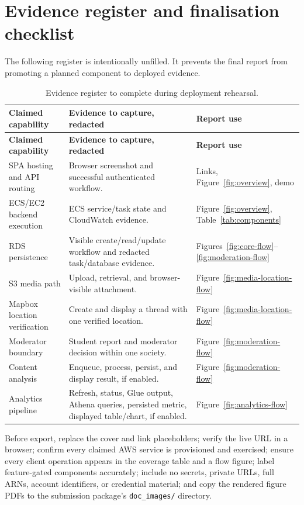 \documentclass[11pt,a4paper]{article}
\begin{document}
\section{Evidence register and finalisation checklist}
The following register is intentionally unfilled. It prevents the final report from promoting a planned component to deployed evidence.
\begin{longtable}{@{}p{38mm}p{80mm}p{35mm}@{}}
\caption{Evidence register to complete during deployment rehearsal.}\\
\toprule \textbf{Claimed capability} & \textbf{Evidence to capture, redacted} & \textbf{Report use}\\ \midrule
\endfirsthead
\toprule \textbf{Claimed capability} & \textbf{Evidence to capture, redacted} & \textbf{Report use}\\ \midrule
\endhead
SPA hosting and API routing & Browser screenshot and successful authenticated workflow. & Links, Figure~\ref{fig:overview}, demo\\
ECS/EC2 backend execution & ECS service/task state and CloudWatch evidence. & Figure~\ref{fig:overview}, Table~\ref{tab:components}\\
RDS persistence & Visible create/read/update workflow and redacted task/database evidence. & Figures~\ref{fig:core-flow}--\ref{fig:moderation-flow}\\
S3 media path & Upload, retrieval, and browser-visible attachment. & Figure~\ref{fig:media-location-flow}\\
Mapbox location verification & Create and display a thread with one verified location. & Figure~\ref{fig:media-location-flow}\\
Moderator boundary & Student report and moderator decision within one society. & Figure~\ref{fig:moderation-flow}\\
Content analysis & Enqueue, process, persist, and display result, if enabled. & Figure~\ref{fig:moderation-flow}\\
Analytics pipeline & Refresh, status, Glue output, Athena queries, persisted metric, displayed table/chart, if enabled. & Figure~\ref{fig:analytics-flow}\\
\bottomrule
\end{longtable}

Before export, replace the cover and link placeholders; verify the live URL in a browser; confirm every claimed AWS service is provisioned and exercised; ensure every client operation appears in the coverage table and a flow figure; label feature-gated components accurately; include no secrets, private URLs, full ARNs, account identifiers, or credential material; and copy the rendered figure PDFs to the submission package's \texttt{doc\_images/} directory.
\end{document}
